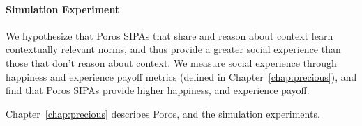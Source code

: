 \documentclass[11pt,          %
               phd,           %
               onehalfspacing %
               ]{ncsuthesis}
\newcommand{\fsl}{\textsl}
\newcommand{\frameworkB}{Poros\xspace}
\newcommand{\frameworkC}{Valar\xspace}
\newcommand{\frameworkD}{Gimli\xspace}
\begin{document}
\paragraph*{Simulation Experiment}
We hypothesize that \frameworkB SIPAs that share and reason about
context learn contextually relevant norms, and thus provide a greater
social experience than those that don't reason about context. We measure
social experience through happiness and experience payoff metrics
(defined in Chapter~\ref{chap:precious}), and find that \frameworkB
SIPAs provide higher happiness, and experience payoff.

Chapter~\ref{chap:precious} describes \frameworkB, and the simulation experiments. 


%
%
\end{document}
